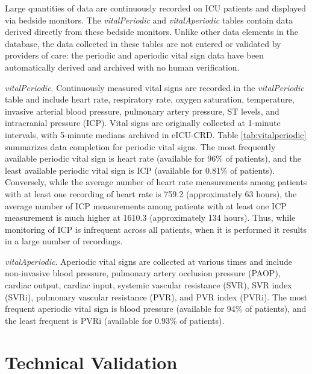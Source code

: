 \documentclass[english]{article}
\newcommand{\tblname}[1]{\emph{#1}}
\begin{document}
Large quantities of data are continuously recorded on ICU patients and
displayed via bedside monitors. The \tblname{vitalPeriodic} and
\tblname{vitalAperiodic} tables contain data derived directly from these
bedside monitors.
Unlike other data elements in the database, the data collected in these tables are not entered or validated by providers of care: the periodic and aperiodic vital sign data have been automatically derived and archived with no human verification.

\tblname{vitalPeriodic}. Continuously measured vital signs are recorded in the \tblname{vitalPeriodic} table
and include heart rate, respiratory rate,
oxygen saturation, temperature, invasive arterial blood pressure,
pulmonary artery pressure, ST levels, and intracranial pressure (ICP).
Vital signs are originally collected at 1-minute intervals, with 5-minute medians archived in eICU-CRD.
Table \ref{tab:vitalperiodic} summarizes data completion for periodic vital signs.
The most frequently available periodic vital sign is heart rate
(available for 96\% of patients), and the least available periodic vital
sign is ICP (available for 0.81\% of patients).
Conversely, while the average number of heart rate measurements among
patients with at least one recording of heart rate is 759.2 (approximately 63 hours),
the average number of ICP measurements among patients with at least one ICP measurement is much higher
at 1610.3 (approximately 134 hours). Thus, while monitoring of ICP is infrequent across all patients,
when it is performed it results in a large number of recordings.


\tblname{vitalAperiodic}. Aperiodic vital signs are collected at various times and include
non-invasive blood pressure, pulmonary artery occlusion pressure (PAOP),
cardiac output, cardiac input, systemic vascular resistance (SVR), SVR
index (SVRi), pulmonary vascular resistance (PVR), and PVR index (PVRi).
The most frequent aperiodic vital sign is blood pressure (available for
94\% of patients), and the least frequent is PVRi (available for 0.93\%
of patients).

\section*{Technical Validation}\label{technical-validation}

\end{document}
